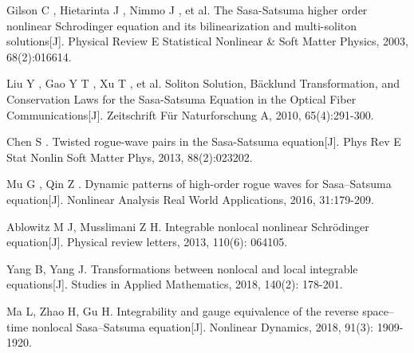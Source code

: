 \cleardoublepage
{}
{}
\nocite{*}
%

\begin{thebibliography}{0}

Gilson C , Hietarinta J , Nimmo J , et al. The Sasa-Satsuma higher order nonlinear Schrodinger equation and its bilinearization and multi-soliton solutions[J]. Physical Review E Statistical Nonlinear \& Soft Matter Physics, 2003, 68(2):016614.

Liu Y , Gao Y T , Xu T , et al. Soliton Solution, Bäcklund Transformation, and Conservation Laws for the Sasa-Satsuma Equation in the Optical Fiber Communications[J]. Zeitschrift Für Naturforschung A, 2010, 65(4):291-300.

Chen S . Twisted rogue-wave pairs in the Sasa-Satsuma equation[J]. Phys Rev E Stat Nonlin Soft Matter Phys, 2013, 88(2):023202.

Mu G , Qin Z . Dynamic patterns of high-order rogue waves for Sasa–Satsuma equation[J]. Nonlinear Analysis Real World Applications, 2016, 31:179-209.


Ablowitz M J, Musslimani Z H. Integrable nonlocal nonlinear Schrödinger equation[J]. Physical review letters, 2013, 110(6): 064105.

Yang B, Yang J. Transformations between nonlocal and local integrable equations[J]. Studies in Applied Mathematics, 2018, 140(2): 178-201.

Ma L, Zhao H, Gu H. Integrability and gauge equivalence of the reverse space–time nonlocal Sasa–Satsuma equation[J]. Nonlinear Dynamics, 2018, 91(3): 1909-1920.

\end{thebibliography}
\cleardoublepage
